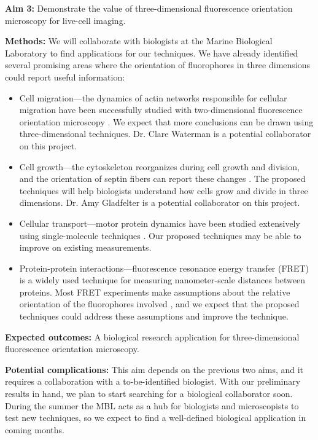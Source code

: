 \documentclass[11pt]{article}
\begin{document}
\noindent\textbf{Aim 3:} Demonstrate the value of three-dimensional fluorescence
  orientation microscopy for live-cell imaging.

\noindent\textbf{Methods:} We will collaborate with biologists at the Marine
Biological Laboratory to find applications for our techniques. We have already
identified several promising areas where the orientation of fluorophores in
three dimensions could report useful information:
\begin{itemize}
\item Cell migration---the dynamics of actin networks responsible for cellular
  migration have been successfully studied with two-dimensional fluorescence
  orientation microscopy \cite{swam}. We expect that more conclusions can be
  drawn using three-dimensional techniques. Dr. Clare Waterman is a potential
  collaborator on this project.
\item Cell growth---the cytoskeleton reorganizes during cell growth and
  division, and the orientation of septin fibers can report these changes
  \cite{mehta2016}. The proposed techniques will help biologists understand how
  cells grow and divide in three dimensions. Dr. Amy Gladfelter is a potential
  collaborator on this project.
\item Cellular transport---motor protein dynamics have been studied extensively
  using single-molecule techniques \cite{toprak2006}. Our proposed techniques
  may be able to improve on existing measurements.
\item Protein-protein interactions---fluorescence resonance energy transfer
  (FRET) is a widely used technique for measuring nanometer-scale distances
  between proteins. Most FRET experiments make assumptions about the relative
  orientation of the fluorophores involved \cite{nov2006}, and we expect that the
  proposed techniques could address these assumptions and improve the technique.
\end{itemize}

\noindent\textbf{Expected outcomes:} A biological research application for
three-dimensional fluorescence orientation microscopy. 

\noindent\textbf{Potential complications:} This aim depends on the previous two
aims, and it requires a collaboration with a to-be-identified biologist. With
our preliminary results in hand, we plan to start searching for a biological
collaborator soon. During the summer the MBL acts as a hub for biologists and
microscopists to test new techniques, so we expect to find a well-defined
biological application in coming months.
\end{document}
